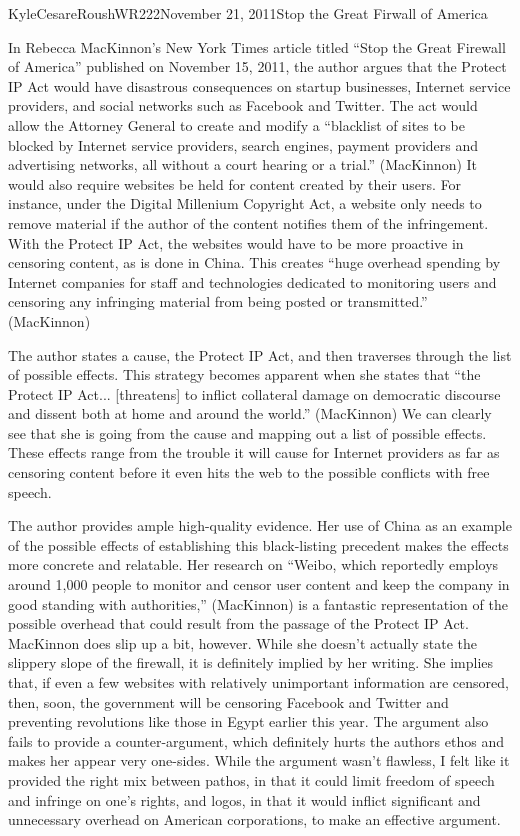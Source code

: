 \documentclass[12pt,letterpaper]{article}
\begin{document}
\begin{mla}{Kyle}{Cesare}{Roush}{WR222}{November 21, 2011}{Stop the Great
Firwall of America}

In Rebecca MacKinnon's New York Times article titled ``Stop the Great Firewall
of America'' published on November 15, 2011, the author argues that the Protect
IP Act would have disastrous consequences on startup businesses, Internet
service providers, and social networks such as Facebook and Twitter.  The act
would allow the Attorney General to create and modify a ``blacklist of sites to
be blocked by Internet service providers, search engines, payment providers and
advertising networks, all without a court hearing or a trial.'' (MacKinnon)  It
would also require websites be held for content created by their users.  For
instance, under the Digital Millenium Copyright Act, a website only needs to
remove material if the author of the content notifies them of the infringement.
With the Protect IP Act, the websites would have to be more proactive in
censoring content, as is done in China.  This creates ``huge overhead spending
by Internet companies for staff and technologies dedicated to monitoring users
and censoring any infringing material from being posted or transmitted.''
(MacKinnon)

The author states a cause, the Protect IP Act, and then traverses through the
list of possible effects.  This strategy becomes apparent when she states that
``the Protect IP Act... [threatens] to inflict collateral damage on democratic
discourse and dissent both at home and around the world.'' (MacKinnon)  We can
clearly see that she is going from the cause and mapping out a list of possible
effects.  These effects range from the trouble it will cause for Internet
providers as far as censoring content before it even hits the web to the
possible conflicts with free speech.

The author provides ample high-quality evidence.  Her use of China as an example
of the possible effects of establishing this black-listing precedent makes the
effects more concrete and relatable.  Her research on ``Weibo, which reportedly
employs around 1,000 people to monitor and censor user content and keep the
company in good standing with authorities,'' (MacKinnon) is a fantastic
representation of the possible overhead that could result from the passage of
the Protect IP Act.  MacKinnon does slip up a bit, however.  While she doesn't
actually state the slippery slope of the firewall, it is definitely implied by
her writing.  She implies that, if even a few websites with relatively
unimportant information are censored, then, soon, the government will be
censoring Facebook and Twitter and preventing revolutions like those in Egypt
earlier this year.  The argument also fails to provide a counter-argument, which
definitely hurts the authors ethos and makes her appear very one-sides.  While
the argument wasn't flawless, I felt like it provided the right mix between
pathos, in that it could limit freedom of speech and infringe on one's rights,
and logos, in that it would inflict significant and unnecessary overhead on
American corporations, to make an effective argument.


\end{mla}
\end{document}
